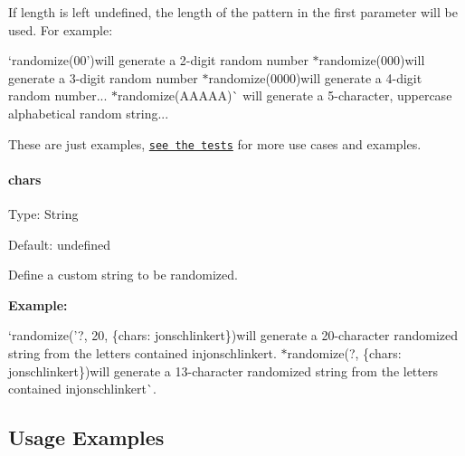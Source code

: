 If {\ttfamily length} is left undefined, the length of the pattern in the first parameter will be used. For example\+:


\begin{DoxyItemize}
\item `randomize(\textquotesingle{}00'){\ttfamily will generate a 2-\/digit random number $\ast$}randomize(\textquotesingle{}000\textquotesingle{}){\ttfamily will generate a 3-\/digit random number $\ast$}randomize(\textquotesingle{}0000\textquotesingle{}){\ttfamily will generate a 4-\/digit random number... $\ast$}randomize(\textquotesingle{}A\+A\+A\+AA\textquotesingle{})\`{} will generate a 5-\/character, uppercase alphabetical random string...
\end{DoxyItemize}

These are just examples, \href{./test.js}{\tt see the tests} for more use cases and examples.

\paragraph*{chars}

Type\+: {\ttfamily String}

Default\+: {\ttfamily undefined}

Define a custom string to be randomized.

{\bfseries Example\+:}


\begin{DoxyItemize}
\item `randomize('?\textquotesingle{}, 20, \{chars\+: \textquotesingle{}jonschlinkert\textquotesingle{}\}){\ttfamily will generate a 20-\/character randomized string from the letters contained in}jonschlinkert{\ttfamily . $\ast$}randomize(\textquotesingle{}?\textquotesingle{}, \{chars\+: \textquotesingle{}jonschlinkert\textquotesingle{}\}){\ttfamily will generate a 13-\/character randomized string from the letters contained in}jonschlinkert\`{}.
\end{DoxyItemize}

\subsection*{Usage Examples}


